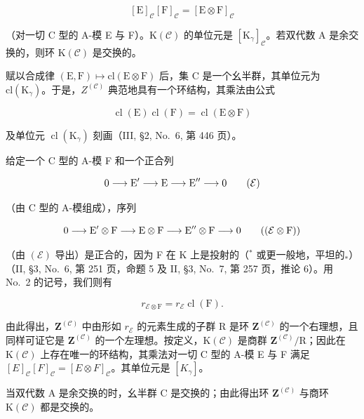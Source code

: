 \[
[ \mathrm{E} ] _ {\mathcal {C}} [ \mathrm{F} ] _ {\mathcal {C}} = [ \mathrm{E} \otimes \mathrm{F} ] _ {\mathcal {C}}
\]

（对一切 C 型的 A-模 E 与 F）。\(\mathrm{K}(\mathcal{C})\) 的单位元是 \([\mathrm{K}_{\gamma}]_{\mathcal{C}}\)。若双代数 A 是余交换的，则环 \(\mathrm{K}(\mathcal{C})\) 是交换的。

赋以合成律 \((\mathrm{E},\mathrm{F})\mapsto\mathrm{cl}(\mathrm{E}\otimes\mathrm{F})\) 后，集 C 是一个幺半群，其单位元为 \(\mathrm{cl}(\mathrm{K}_{\gamma})\)。于是，\(Z^{(\mathcal{C})}\) 典范地具有一个环结构，其乘法由公式

\[
\operatorname{cl} (\mathrm{E}) \operatorname{cl} (\mathrm{F}) = \operatorname{cl} (\mathrm{E} \otimes \mathrm{F})\tag{13}
\]

及单位元 \(\operatorname{cl}(\mathrm{K}_{\gamma})\) 刻画（III, §2, No.~6, 第 446 页）。

给定一个 C 型的 A-模 F 和一个正合列

\[
0 \longrightarrow \mathrm{E} ^ {\prime} \longrightarrow \mathrm{E} \longrightarrow \mathrm{E} ^ {\prime \prime} \longrightarrow 0\tag{\( \mathcal{E} \)}
\]

（由 C 型的 A-模组成），序列

\[
0 \longrightarrow \mathrm{E} ^ {\prime} \otimes \mathrm{F} \longrightarrow \mathrm{E} \otimes \mathrm{F} \longrightarrow \mathrm{E} ^ {\prime \prime} \otimes \mathrm{F} \longrightarrow 0\tag{\(\left(\mathcal{E}\otimes \mathrm{F}\right)\)}
\]

（由 \((\mathcal{E})\) 导出）是正合的，因为 F 在 K 上是投射的（\(^{*}\) 或更一般地，平坦的\(_{*}\)）（II, §3, No.~6, 第 251 页，命题 5 及 II, §3, No.~7, 第 257 页，推论 6）。用 No.~2 的记号，我们则有

\[
r _ {\mathcal {E} \otimes \mathrm{F}} = r _ {\mathcal {E}} \operatorname{cl} (\mathrm{F}).\tag{14}
\]

由此得出，\(\mathbf{Z}^{(\mathcal{C})}\) 中由形如 \(r_{\mathcal{E}}\) 的元素生成的子群 R 是环 \(\mathbf{Z}^{(\mathcal{C})}\) 的一个右理想，且同样可证它是 \(\mathbf{Z}^{(\mathcal{C})}\) 的一个左理想。按定义，\(\mathrm{K}(\mathcal{C})\) 是商群 \(\mathbf{Z}^{(\mathcal{C})}/\mathrm{R}\)；因此在 \(\mathrm{K}(\mathcal{C})\) 上存在唯一的环结构，其乘法对一切 C 型的 A-模 E 与 F 满足 \([E]_{\mathcal{C}}[F]_{\mathcal{C}} = [E \otimes F]_{\mathcal{C}}\)。其单位元是 \([K_{\gamma}]\)。

当双代数 A 是余交换的时，幺半群 C 是交换的；由此得出环 \(\mathbf{Z}^{(\mathcal{C})}\) 与商环 \(\mathrm{K}(\mathcal{C})\) 都是交换的。

